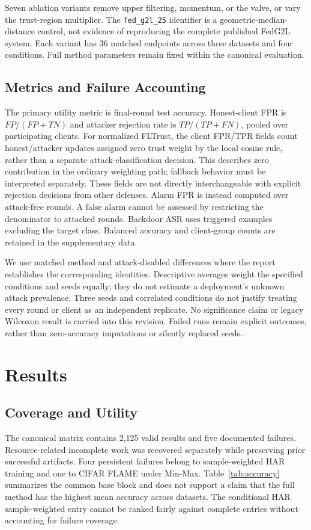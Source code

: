 \documentclass[journal]{IEEEtran}
\begin{document}
Seven ablation variants remove upper filtering, momentum, or the valve, or vary the trust-region multiplier. The \texttt{fed\_g2l\_25} identifier is a geometric-median-distance control, not evidence of reproducing the complete published FedG2L system. Each variant has 36 matched endpoints across three datasets and four conditions. Full method parameters remain fixed within the canonical evaluation.

\subsection{Metrics and Failure Accounting}
The primary utility metric is final-round test accuracy. Honest-client FPR is $FP/(FP+TN)$ and attacker rejection rate is $TP/(TP+FN)$, pooled over participating clients. For normalized FLTrust, the client FPR/TPR fields count honest/attacker updates assigned zero trust weight by the local cosine rule, rather than a separate attack-classification decision. This describes zero contribution in the ordinary weighting path; fallback behavior must be interpreted separately. These fields are not directly interchangeable with explicit rejection decisions from other defenses. Alarm FPR is instead computed over attack-free rounds. A false alarm cannot be assessed by restricting the denominator to attacked rounds. Backdoor ASR uses triggered examples excluding the target class. Balanced accuracy and client-group counts are retained in the supplementary data.

We use matched method and attack-disabled differences where the report establishes the corresponding identities. Descriptive averages weight the specified conditions and seeds equally; they do not estimate a deployment's unknown attack prevalence. Three seeds and correlated conditions do not justify treating every round or client as an independent replicate. No significance claim or legacy Wilcoxon result is carried into this revision. Failed runs remain explicit outcomes, rather than zero-accuracy imputations or silently replaced seeds.

\section{Results}
\subsection{Coverage and Utility}
The canonical matrix contains 2,125 valid results and five documented failures. Resource-related incomplete work was recovered separately while preserving prior successful artifacts. Four persistent failures belong to sample-weighted HAR training and one to CIFAR FLAME under Min-Max. Table~\ref{tab:accuracy} summarizes the common base block and does not support a claim that the full method has the highest mean accuracy across datasets. The conditional HAR sample-weighted entry cannot be ranked fairly against complete entries without accounting for failure coverage.

\end{document}
